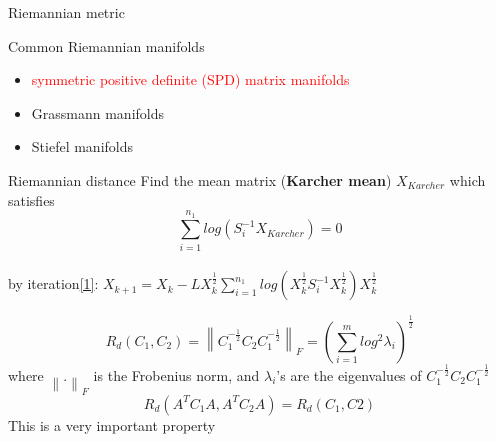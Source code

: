 \documentclass[10pt]{beamer}
\newcommand{\norm}[1]{\left\lVert#1\right\rVert}
\begin{document}
\begin{frame}{Riemannian metric}
    \begin{exampleblock}{Common Riemannian manifolds}
	\begin{itemize}
    \item \textcolor{red}{symmetric positive definite (SPD) matrix manifolds}
    \item Grassmann manifolds
    \item Stiefel manifolds
    \end{itemize}
    \end{exampleblock}
\end{frame}
\begin{frame}{Riemannian distance}
Find the mean matrix (\textbf{Karcher mean}) $X_{Karcher}$ which satisfies
    \begin{equation}\sum\limits^{n_1}_{i=1}log(S_i^{-1}X_{Karcher})=0\end{equation}\\
    by iteration\href{https://www.sciencedirect.com/science/article/pii/S0024379511006616}{[1]}: $
        X_{k+1}=X_k-L X_k^{\frac{1}{2}}\sum\limits^{n_1}_{i=1}log(X_k^{\frac{1}{2}}S_i^{-1}X_k^{\frac{1}{2}})X_k^{\frac{1}{2}}
        \label{eq:iteration2} $ 

    \begin{equation}
R_d(C_1,C_2) = \norm{ C_1^{-\frac{1}{2}}C_2C_1^{-\frac{1}{2}}}_F = \left(  \sum_{i=1}^mlog^2\lambda_i  \right)^\frac{1}{2}
    \end{equation} 
    where $\norm{.}_F$ is the Frobenius norm, and $\lambda_i$'s are the eigenvalues  of $ C_1^{-\frac{1}{2}}C_2C_1^{-\frac{1}{2}}$
    \begin{equation}
        R_d(A^TC_1A,A^TC_2A)=R_d(C_1,C2)
    \end{equation}
    This is a very important property
\end{frame}
\end{document}

